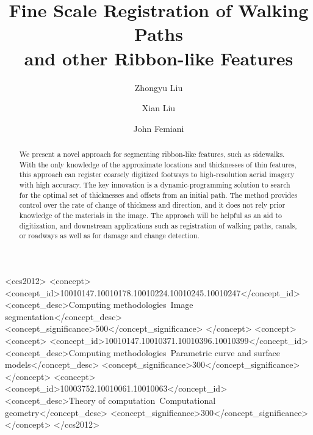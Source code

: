 \documentclass[sigconf]{acmart}
\begin{document}
\title[Fine Scale Registration of Ribbon-like Features]{Fine Scale Registration of Walking Paths \\and other Ribbon-like Features}


\author{Zhongyu Liu}

\author{Xian Liu}


\author{John Femiani}




\begin{abstract}
	We present a novel approach for segmenting ribbon-like features, such as sidewalks.
	With the only knowledge of the approximate locations and thicknesses of thin features, this approach can register coarsely digitized footways to high-resolution aerial imagery with high accuracy. 
	The key innovation is a dynamic-programming solution to search for the optimal set of thicknesses 
	and offsets from an initial path. The method provides control over the rate of change of thickness 
	and direction, and it does not rely prior knowledge of the materials in the image.
   The approach will be helpful as an aid to digitization, and  downstream applications such as registration of walking paths, canals, or roadways as well as for damage and change detection.
\end{abstract}

%
%
\begin{CCSXML}
<ccs2012>
<concept>
<concept_id>10010147.10010178.10010224.10010245.10010247</concept_id>
<concept_desc>Computing methodologies~Image segmentation</concept_desc>
<concept_significance>500</concept_significance>
</concept>
<concept>
<concept>
<concept_id>10010147.10010371.10010396.10010399</concept_id>
<concept_desc>Computing methodologies~Parametric curve and surface models</concept_desc>
<concept_significance>300</concept_significance>
</concept>
<concept>
<concept_id>10003752.10010061.10010063</concept_id>
<concept_desc>Theory of computation~Computational geometry</concept_desc>
<concept_significance>300</concept_significance>
</concept>
</ccs2012>
\end{CCSXML}
\end{document}
